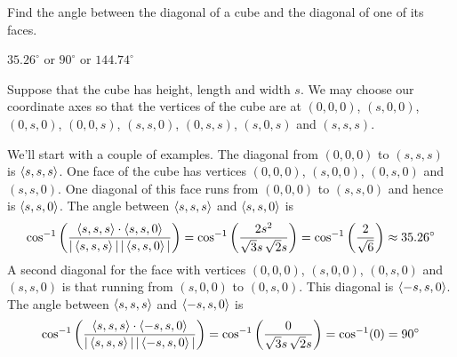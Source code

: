 \begin{question}
Find the angle between the diagonal of a cube and the diagonal
of one of its faces.
\end{question}

%

\begin{answer}
$35.26^\circ$ or $90^\circ$ or $144.74^\circ$
\end{answer}

\begin{solution}
Suppose that the cube has height, length and width $s$.
We may choose our coordinate axes so that the vertices
of the cube are at $(0,0,0)$, $(s,0,0)$, $(0,s,0)$, $(0,0,s)$, 
$(s,s,0)$, $(0,s,s)$, $(s,0,s)$ and $(s,s,s)$. 

We'll start with a couple of examples. The diagonal from $(0,0,0)$
to $(s,s,s)$ is $\left< s,s,s\right>$. One face of the cube has vertices $(0,0,0)$,
$(s,0,0)$, $(0,s,0)$ and $(s,s,0)$. One diagonal of this face runs from
$(0,0,0)$ to $(s,s,0)$ and hence is $\left< s,s,0\right>$. The angle between 
$\left< s,s,s\right>$ and $\left< s,s,0\right>$ is
\begin{align*}
\cos^{-1}\left(\frac{\left< s,s,s\right>\cdot\left< s,s,0\right>}
                    {|\left< s,s,s\right>|\,|\left< s,s,0\right>|}\right)
=\cos^{-1}\left(\frac{2s^2}{\sqrt{3}s\,\sqrt{2}s}\right)
=\cos^{-1}\left(\frac{2}{\sqrt{6}}\right)\approx 35.26^\circ
\end{align*}
A second diagonal for the face with vertices  $(0,0,0)$,
$(s,0,0)$, $(0,s,0)$ and $(s,s,0)$ is that running from
$(s,0,0)$ to $(0,s,0)$. This diagonal is $\left< -s,s,0\right>$. The angle between 
$\left< s,s,s\right>$ and $\left< -s,s,0\right>$ is
\begin{align*}
\cos^{-1}\left(\frac{\left< s,s,s\right>\cdot\left< -s,s,0\right>}
               {|\left< s,s,s\right>|\,|\left< -s,s,0\right>|}\right)
=\cos^{-1}\left(\frac{0}{\sqrt{3}s\,\sqrt{2}s}\right)
=\cos^{-1}(0)=90^\circ
\end{align*}


\end{solution}
